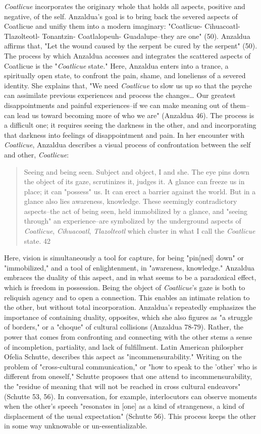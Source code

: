 \documentclass[11pt]{article}
\begin{document}
\emph{Coatlicue} incorporates the originary whole that holds all aspects,
positive and negative, of the self. Anzaldua's goal is to bring back
the severed aspects of Coatlicue and unifiy them into a modern
imaginary: "Coatlicue- Cihuacoatl- Tlazolteotl- Tonantzin-
Coatlalopeuh- Guadalupe--they are one" (50). Anzaldua affirms that,
"Let the wound caused by the serpent be cured by the serpent"
(50). The process by which Anzaldua accesses and integrates the
scattered aspects of Coatlicue is the "\emph{Coatlicue} state." Here,
Anzaldua enters into a trance, a spiritually open state, to confront
the pain, shame, and lonelienss of a severed identity. She explains
that, "We need \emph{Coatlicue} to slow us up so that the psyche can
assimilate previous experiences and process the changes\ldots{} Our
greatest disappointments and painful experiences--if we can make
meaning out of them--can lead us toward becoming more of who we are"
(Anzaldua 46). The process is a difficult one; it requires seeing the
darkness in the other, and and incorporating that darkness into
feelings of disappointment and pain. In her encounter with
\emph{Coatlicue}, Anzaldua describes a visual process of confrontation
between the self and other, \emph{Coatlicue}:
\begin{quote}
Seeing and being seen. Subject and object, I and she. The eye pins
down the object of its gaze, scrutinizes it, judges it. A glance can
freeze us in place; it can "possess" us. It can erect a barrier
against the world. But in a glance also lies awareness,
knowledge. These seemingly contradictory aspects--the act of being
seen, held immobilized by a glance, and "seeing through" an
experience--are symbolized by the underground aspects of \emph{Coatlicue},
\emph{Cihuacoatl}, \emph{Tlazolteotl} which cluster in what I call the
\emph{Coatlicue} state. 42
\end{quote}
Here, vision is simultaneously a tool for capture, for being "pin[ned]
down" or "immobilized," and a tool of enlightenment, in "awareness,
knowledge." Anzaldua embraces the duality of this aspect, and in what
seems to be a paradoxical effect, which is freedom in
possession. Being the object of \emph{Coatlicue}'s gaze is both to
reliquish agency and to open a connection. This enables an intimate
relation to the other, but without total incorporation. Anzaldua's
repeatedly emphasizes the importance of containing duality, opposites,
which she also figures as "a struggle of borders," or a "choque" of
cultural collisions (Anzaldua 78-79). Rather, the power that comes
from confronting and connecting with the other stems a sense of
incompletion, partiality, and lack of fulfillment. Latin American
philospher Ofelia Schutte, describes this aspect as
"incommensurability." Writing on the problem of "cross-cultural
communication," or "how to speak to the 'other' who is different from
oneself," Schutte proposes that one attend to incommensurability, the
"residue of meaning that will not be reached in cross cultural
endeavors" (Schutte 53, 56). In conversation, for example,
interlocutors can observe moments when the other's speech "resonates
in [one] as a kind of strangeness, a kind of displacement of the usual
expectation" (Schutte 56). This process keeps the other in some way
unknowable or un-essentializable.
\end{document}
